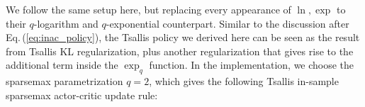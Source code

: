 \documentclass{article}
\newcommand{\AdaBracket}[1]{\left(#1\right)}
\newcommand{\AdaRectBracket}[1]{\left[#1\right]}
\newcommand{\qlog}{$q$-logarithm }
\newcommand{\expq}[1]{\exp_{q}\!#1}
\newcommand{\eq}[1]{Eq.\,(#1)}
\newcommand{\datasetPolicy}{\pi_{\mathcal{D}}}
\begin{document}
We follow the same setup here, but replacing every appearance of $\ln, \exp$ to their \qlog and $q$-exponential counterpart.
Similar to the discussion after \eq{\ref{eq:inac_policy}}, the Tsallis policy we derived here can be seen as the result from Tsallis KL regularization, plus another regularization that gives rise to the additional term inside the $\exp_q$ function.
In the implementation, we choose the sparsemax parametrization $q=2$, which gives the following Tsallis in-sample sparsemax actor-critic update rule:
\end{document}
